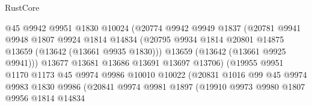 \begin{lexlean}{RustCore}
\begin{coremodule}
                                  @45
                                  @9942
                                  @9951
                                  @1830
                                  @10024
                                  (@20774
                                    @9942
                                    @9949
                                    @1837
                                    (@20781
                                      @9941
                                      @9948
                                      @1807
                                      @9924
                                      @1814
                                      @14834
                                      (@20795
                                        @9934
                                        @1814
                                        @20801
                                        @14875
                                        @13659
                                        (@13642 (@13661 @9935 @1830)))
                                      @13659
                                      (@13642 (@13661 @9925 @9941)))
                                    @13677
                                    @13681
                                    @13686
                                    @13691
                                    @13697
                                    @13706)
                                  (@19955
                                    @9951
                                    @1170
                                    @1173
                                    @45
                                    @9974
                                    @9986
                                    @10010
                                    @10022
                                    (@20831
                                      @1016
                                      @99
                                      @45
                                      @9974
                                      @9983
                                      @1830
                                      @9986
                                      (@20841
                                        @9974
                                        @9981
                                        @1897
                                        (@19910
                                          @9973
                                          @9980
                                          @1807
                                          @9956
                                          @1814
                                          @14834

\end{coremodule}
\end{lexlean}
